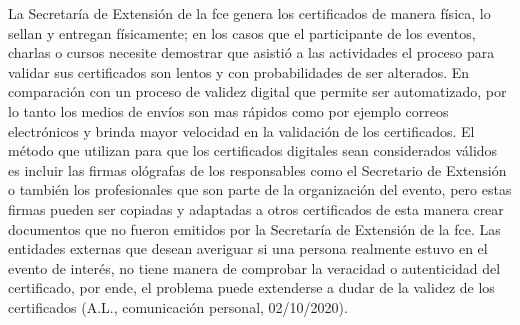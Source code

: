 
La Secretaría de Extensión de la \gls{fce} genera los certificados de manera física, lo sellan y entregan  físicamente; en los casos
que el participante de los eventos, charlas o cursos necesite demostrar que asistió a las actividades el 
proceso para validar sus certificados son lentos y con probabilidades de ser alterados. En comparación con
un proceso de validez digital que permite  ser automatizado, por lo tanto los medios de envíos son mas rápidos como por ejemplo
correos electrónicos y  brinda mayor velocidad en la validación de los certificados.
El método que utilizan para que los certificados digitales sean considerados válidos es incluir las firmas ológrafas de 
los responsables como el Secretario de Extensión o también los profesionales que son parte de la organización del evento, pero estas firmas
pueden ser copiadas y adaptadas a otros certificados de esta manera crear documentos que no fueron emitidos por la Secretaría de Extensión de la \gls{fce}.
Las entidades externas que desean averiguar si una persona realmente estuvo en el evento de interés, no tiene manera de 
comprobar la veracidad o autenticidad del certificado, por ende, el problema puede extenderse a dudar de la validez de los certificados (A.L., comunicación personal, 02/10/2020).%
